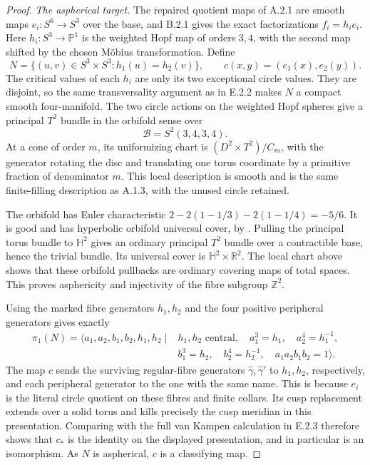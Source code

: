 \begin{proof}
\emph{The aspherical target.}
The repaired quotient maps of A.2.1 are smooth maps
$e_i:S^6\to S^3$ over the base, and B.2.1 gives the exact
factorizations $f_i=h_i e_i$. Here $h_i:S^3\to\mathbb P^1$
is the weighted Hopf map of orders $3,4$, with the second
map shifted by the chosen M\"obius transformation. Define
\[
 N=\{(u,v)\in S^3\times S^3:h_1(u)=h_2(v)\},\qquad
 c(x,y)=(e_1(x),e_2(y)).
 \tag{E.B5}
\]
The critical values of each $h_i$ are only its two exceptional
circle values. They are disjoint, so the same transversality
argument as in E.2.2 makes $N$ a compact smooth four-manifold.
The two circle actions on the weighted Hopf spheres give a
principal $T^2$ bundle in the orbifold sense over
\[
                  \mathcal B=S^2(3,4,3,4).
\]
At a cone of order $m$, its uniformizing chart is
$(D^2\times T^2)/C_m$, with the generator rotating the disc
and translating one torus coordinate by a primitive fraction
of denominator $m$. This local description is smooth and is
the same finite-filling description as A.1.3, with the unused
circle retained.

The orbifold has Euler characteristic
$2-2(1-1/3)-2(1-1/4)=-5/6$. It is good and has hyperbolic
orbifold universal cover, by
\cite[Theorems 2.3--2.4 and the Euler-number discussion in
Section 2]{rootScott83}. Pulling the principal torus bundle to
$\mathbb H^2$ gives an ordinary principal $T^2$ bundle over a
contractible base, hence the trivial bundle. Its universal
cover is $\mathbb H^2\times\mathbb R^2$. The local chart above
shows that these orbifold pullbacks are ordinary covering maps
of total spaces. This proves asphericity and injectivity of
the fibre subgroup $\mathbb Z^2$.

Using the marked fibre generators $h_1,h_2$ and the four
positive peripheral generators gives exactly
\[
 \begin{split}
 \pi_1(N)=\langle a_1,a_2,b_1,b_2,h_1,h_2\mid {}&h_1,h_2
       \text{ central},\quad a_1^3=h_1,\quad a_2^4=h_1^{-1},\\
 &b_1^3=h_2,\quad b_2^4=h_2^{-1},\quad
 a_1a_2b_1b_2=1\rangle.
 \end{split}
\]
The map $c$ sends the surviving regular-fibre generators
$\widehat\gamma,\widehat\gamma'$ to $h_1,h_2$, respectively,
and each peripheral generator to the one with the same name.
This is because $e_i$ is the literal circle quotient on these
fibres and finite collars. Its cusp replacement extends over
a solid torus and kills precisely the cusp meridian in this
presentation. Comparing with the full van Kampen calculation
in E.2.3 therefore shows that $c_*$ is the identity on the
displayed presentation, and in particular is an isomorphism.
As $N$ is aspherical, $c$ is a classifying map.


\end{proof}
